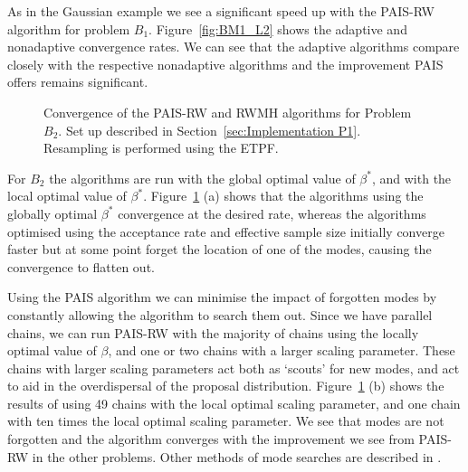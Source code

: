 \documentclass[final]{siamltex}
\begin{document}
As in the Gaussian example we see a significant speed up with the
PAIS-RW algorithm for problem $B_1$. Figure~\ref{fig:BM1_L2} shows the adaptive and nonadaptive convergence rates. We can see that the adaptive algorithms compare closely with the
respective nonadaptive algorithms and the improvement PAIS offers remains significant.

\begin{figure}[htb]
\centering
{}
\caption{Convergence of the PAIS-RW and RWMH algorithms for Problem $B_2$. Set up described in Section~\ref{sec:Implementation P1}. Resampling is performed using the ETPF.}
\label{fig:BM2_L2}
\end{figure}

For $B_2$ the algorithms are run with the global optimal value of $\beta^*$, and with the local optimal value of $\beta^*$. Figure~\ref{fig:BM2_L2} (a) shows that the algorithms using the globally optimal $\beta^*$ convergence at the desired rate, whereas the algorithms optimised using the acceptance rate and effective sample size initially converge faster but at some point forget the location of one of the modes, causing the convergence to flatten out.

Using the PAIS algorithm we can minimise the impact of forgotten modes by constantly allowing the algorithm to search them out. Since we have parallel chains, we can run PAIS-RW with the majority of chains using the locally optimal value of $\beta$, and one or two chains with a larger scaling parameter. These chains with larger scaling parameters act both as `scouts' for new modes, and act to aid in the overdispersal of the proposal distribution. Figure~\ref{fig:BM2_L2} (b) shows the results of using 49 chains with the local optimal scaling parameter, and one chain with ten times the local optimal scaling parameter. We see that modes are not forgotten and the algorithm converges with the improvement we see from PAIS-RW in the other problems. Other methods of mode searches are described in \cite{lan2013wormhole}.
\end{document}

